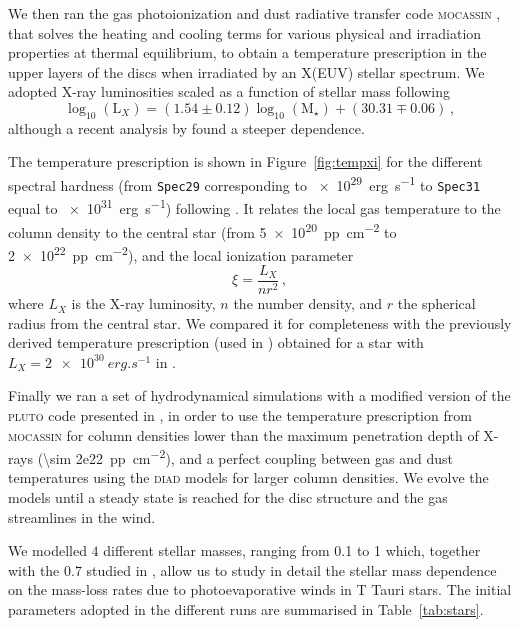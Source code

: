 \documentclass[usenatbib,useAMS,usedcolumn]{mnras}
\begin{document}
We then ran the gas photoionization and dust radiative transfer code \textsc{mocassin} , that solves the heating and cooling terms for various physical and irradiation properties at thermal equilibrium, to obtain a temperature prescription in the upper layers of the discs when irradiated by an X(EUV) stellar spectrum.
We adopted X-ray luminosities scaled as a function of stellar mass following 
\begin{equation}\label{eq:Lx}
	\log_{10}{(\mathrm{L}_X)} = (1.54 \pm 0.12) \log_{10}{(\mathrm{M}_\star)} + (30.31 \mp 0.06)\,,
\end{equation}
although a recent analysis by  found a steeper dependence.

The temperature prescription is shown in Figure~\ref{fig:tempxi} for the different spectral hardness (from \texttt{Spec29} corresponding to \SI{e29}{erg.s^{-1}} to \texttt{Spec31} equal to \SI{e31}{erg.s^{-1}}) following .
It relates the local gas temperature to the column density to the central star (from \SI{5e20}{pp.cm^{-2}} to \SI{2e22}{pp.cm^{-2}}), and the local ionization parameter 
\begin{equation}
    \xi = \frac{L_X}{n r^2}\,,
\end{equation}
where $L_X$ is the X-ray luminosity, $n$ the number density, and $r$ the spherical radius from the central star. We compared it for completeness with the previously derived temperature prescription (used in ) obtained for a star with $L_X=\SI{2e30}{erg.s^{-1}}$ in .

Finally we ran a set of hydrodynamical simulations with a modified version of the \textsc{pluto} code  presented in , in order to use the temperature prescription from \textsc{mocassin} for column densities lower than the maximum penetration depth of X-rays (\SI{\sim 2e22}{pp.cm^{-2}}), and a perfect coupling between gas and dust temperatures using the \textsc{diad} models for larger column densities.
We evolve the models until a steady state is reached for the disc structure and the gas streamlines in the wind.

We modelled $4$ different stellar masses, ranging from \SI{0.1}{\solarmass} to \SI{1}{\solarmass} which, together with the \SI{0.7}{\solarmass} studied in , allow us to study in detail the stellar mass dependence on the mass-loss rates due to photoevaporative winds in T Tauri stars. The initial parameters adopted in the different runs are summarised in Table~\ref{tab:stars}.
\end{document}
